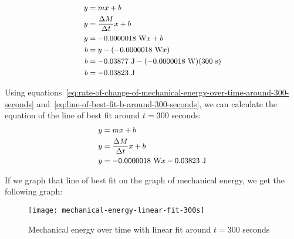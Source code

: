 \documentclass[titlepage]{article}
\begin{document}
            \begin{equation}
                \small
                \begin{aligned}
                    y &= mx + b \\
                    y &= \frac{\Delta M}{\Delta t}x + b \\
                    y &= -0.0000018 \text{ W}x + b \\
                    b &= y - (-0.0000018 \text{ W}x) \\
                    b &= -0.03877 \text{ J} - (-0.0000018 \text{ W})(300 \text{ s}) \\
                    b &= -0.03823 \text{ J} \\
                \end{aligned}\label{eq:line-of-best-fit-b-around-300-seconds}
            \end{equation}
            
            Using equations~\ref{eq:rate-of-change-of-mechanical-energy-over-time-around-300-seconds} and~\ref{eq:line-of-best-fit-b-around-300-seconds}, we can calculate the equation of the line of best fit around $t=300$ seconds:
            \begin{equation}
                \small
                \begin{aligned}
                    y &= mx + b \\
                    y &= \frac{\Delta M}{\Delta t}x + b \\
                    y &= -0.0000018 \text{ W}x - 0.03823 \text{ J} \\
                \end{aligned}\label{eq:line-of-best-fit-equation-around-300-seconds}
            \end{equation}
            
            If we graph that line of best fit on the graph of mechanical energy, we get the following graph:
            
            \begin{figure}[H]
                \centering
                \texttt{[image: mechanical-energy-linear-fit-300s]}
                \caption{Mechanical energy over time with linear fit around $t=300$ seconds}
                \label{fig:mechanical-energy-linear-fit-300s}
            \end{figure}
            
\end{document}
